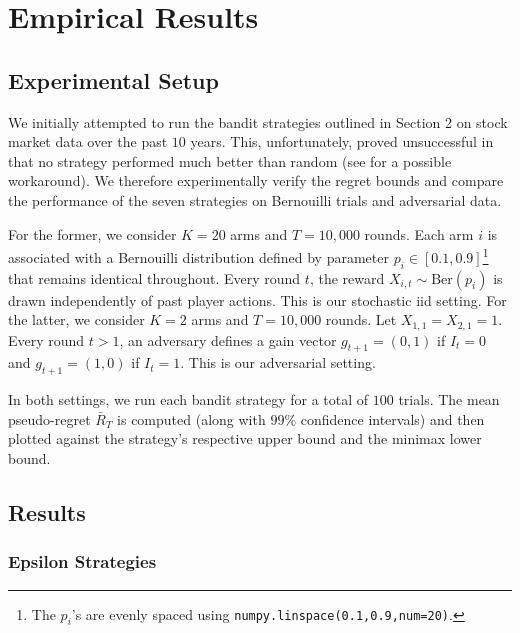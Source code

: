 \documentclass[12pt]{article}
\begin{document}
\section{Empirical Results}

\subsection{Experimental Setup}

We initially attempted to run the bandit strategies outlined in Section 2 on stock market data over the past $10$ years. This, unfortunately, proved unsuccessful in that no strategy performed much better than random (see \cite{shen2015} for a possible workaround). We therefore experimentally verify the regret bounds and compare the performance of the seven strategies on Bernouilli trials and adversarial data.

For the former, we consider $K=20$ arms and $T=10,000$ rounds. Each arm $i$ is associated with a Bernouilli distribution defined by parameter $p_{i}\in[0.1,0.9]$\footnote{The $p_{i}$'s are evenly spaced using \texttt{numpy.linspace(0.1,0.9,num=20)}.} that remains identical throughout. Every round $t$, the reward $X_{i,t}\sim\text{Ber}(p_{i})$ is drawn independently of past player actions. This is our stochastic iid setting. For the latter, we consider $K=2$ arms and $T=10,000$ rounds. Let $X_{1,1}=X_{2,1}=1$. Every round $t>1$, an adversary defines a gain vector $g_{t+1}=(0,1)$ if $I_{t}=0$ and $g_{t+1}=(1,0)$ if $I_{t}=1$. This is our adversarial setting.

In both settings, we run each bandit strategy for a total of $100$ trials. The mean pseudo-regret $\bar{R}_{T}$ is computed (along with $99\%$ confidence intervals) and then plotted against the strategy's respective upper bound and the minimax lower bound.

\subsection{Results}

\subsubsection{Epsilon Strategies}
\end{document}
